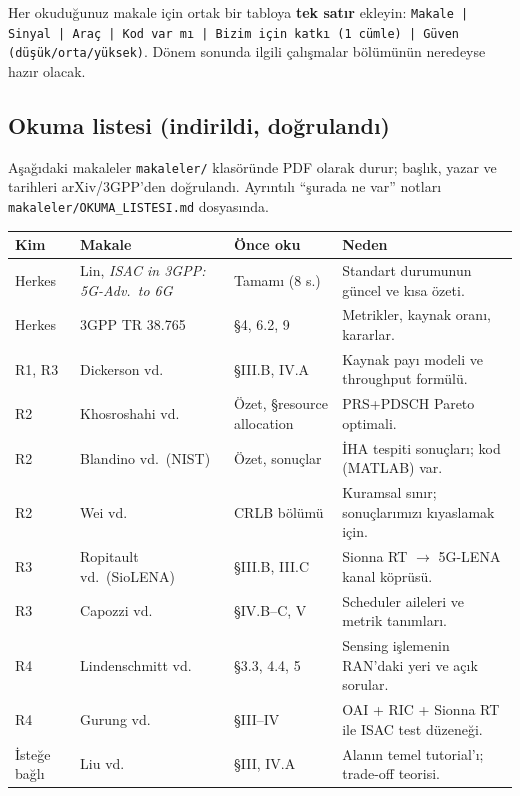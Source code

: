 \begin{ipucu}
Her okuduğunuz makale için ortak bir tabloya \textbf{tek satır} ekleyin: \texttt{Makale | Sinyal | Araç | Kod var mı | Bizim için katkı (1 cümle) | Güven (düşük/orta/yüksek)}.
Dönem sonunda ilgili çalışmalar bölümünün neredeyse hazır olacak.
\end{ipucu}

\subsection{Okuma listesi (indirildi, doğrulandı)}\label{sec:okuma-liste}

Aşağıdaki makaleler \texttt{makaleler/} klasöründe PDF olarak durur; başlık, yazar ve tarihleri arXiv/3GPP'den doğrulandı.
Ayrıntılı ``şurada ne var'' notları \texttt{makaleler/OKUMA\_LISTESI.md} dosyasında.

\begingroup\sffamily\small
\begin{xltabular}{\textwidth}{@{}p{0.9cm}p{4.5cm}p{2.4cm}X@{}}
\toprule
\textbf{Kim} & \textbf{Makale} & \textbf{Önce oku} & \textbf{Neden} \\
\midrule
Herkes & Lin, \emph{ISAC in 3GPP: 5G-Adv.\ to 6G} \cite{lin} & Tamamı (8 s.) & Standart durumunun güncel ve kısa özeti. \\
Herkes & 3GPP TR 38.765 & \S4, 6.2, 9 & Metrikler, kaynak oranı, kararlar. \\
R1, R3 & Dickerson vd.\ \cite{dickerson} & \S III.B, IV.A & Kaynak payı modeli ve throughput formülü. \\
R2 & Khosroshahi vd.\ \cite{khos} & Özet, \S resource allocation & PRS+PDSCH Pareto optimali. \\
R2 & Blandino vd.\ (NIST) \cite{nist} & Özet, sonuçlar & İHA tespiti sonuçları; kod (MATLAB) var. \\
R2 & Wei vd.\ \cite{wei} & CRLB bölümü & Kuramsal sınır; sonuçlarımızı kıyaslamak için. \\
R3 & Ropitault vd.\ (SioLENA) \cite{siolena} & \S III.B, III.C & Sionna RT $\rightarrow$ 5G-LENA kanal köprüsü. \\
R3 & Capozzi vd.\ \cite{capozzi} & \S IV.B--C, V & Scheduler aileleri ve metrik tanımları. \\
R4 & Lindenschmitt vd.\ \cite{linden} & \S 3.3, 4.4, 5 & Sensing işlemenin RAN'daki yeri ve açık sorular. \\
R4 & Gurung vd.\ \cite{gurung} & \S III--IV & OAI + RIC + Sionna RT ile ISAC test düzeneği. \\
İsteğe bağlı & Liu vd.\ \cite{liu22} & \S III, IV.A & Alanın temel tutorial'ı; trade-off teorisi. \\
\bottomrule
\end{xltabular}
\endgroup
